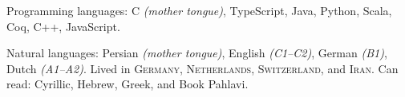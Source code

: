 \documentclass[10pt,a4paper]{article}
\begin{document}


\spacedhrule{0.5em}{-0.4em}


\inlineheadsection  %
  {Programming languages:}
  {C \emph{(mother tongue)}, TypeScript, Java, Python, Scala, Coq, C++, JavaScript.}

\vspace{0.5em}
\inlineheadsection
  {Natural languages:}
  {Persian \emph{(mother tongue)}, English \emph{(C1--C2)}, German \emph{(B1)}, Dutch \emph{(A1--A2)}.
  Lived in \textsc{Germany}, \textsc{Netherlands},  \textsc{Switzerland}, and \textsc{Iran}. Can read: Cyrillic, Hebrew, Greek, and Book Pahlavi.
  }

\end{document}
